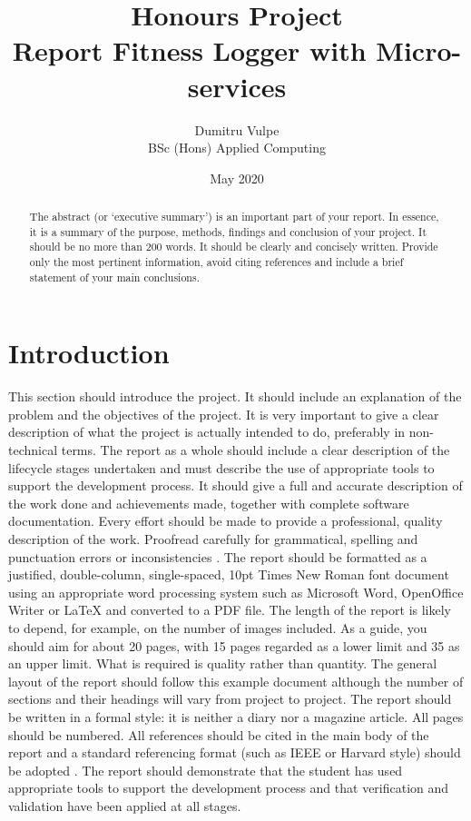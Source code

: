 \documentclass[twocolumn]{article}
\title{Honours Project\\Report Fitness Logger with Micro-services}
\author{Dumitru Vulpe\\BSc (Hons) Applied Computing}
\date{May 2020}
\begin{document}
\maketitle


\begin{abstract}
The abstract (or ‘executive summary’) is an important part of your report. In essence, it is a summary of the purpose, methods, findings and conclusion of your project. It should be no more than 200 words. It should be clearly and concisely written. Provide only the most pertinent information, avoid citing references and include a brief statement of your main conclusions.  
\end{abstract}


\section{Introduction}
\vspace{-1ex}

This section should introduce the project. It should include an explanation of the problem and the objectives of the project. It is very important to give a clear description of what the project is actually intended to do, preferably in non-technical terms. The report as a whole should include a clear description of the lifecycle stages undertaken and must describe the use of appropriate tools to support the development process. It should give a full and accurate description of the work done and achievements made, together with complete software documentation. Every effort should be made to provide a professional, quality description of the work. Proofread carefully for grammatical, spelling and punctuation errors or inconsistencies \cite{BBC}. The report should be formatted as a justified, double-column, single-spaced, 10pt Times New Roman font document using an appropriate word processing system such as Microsoft Word, OpenOffice Writer or LaTeX and converted to a PDF file. The length of the report is likely to depend, for example, on the number of images included. As a guide, you should aim for about 20 pages, with 15 pages regarded as a lower limit and 35 as an upper limit. What is required is quality rather than quantity. The general layout of the report should follow this example document although the number of sections and their headings will vary from project to project. The report should be written in a formal style: it is neither a diary nor a magazine article. All pages should be numbered. All references should be cited in the main body of the report and a standard referencing format (such as IEEE or Harvard style) should be adopted \cite{Wilde}. The report should demonstrate that the student has used appropriate tools to support the development process and that verification and validation have been applied at all stages. 
	
\end{document}
